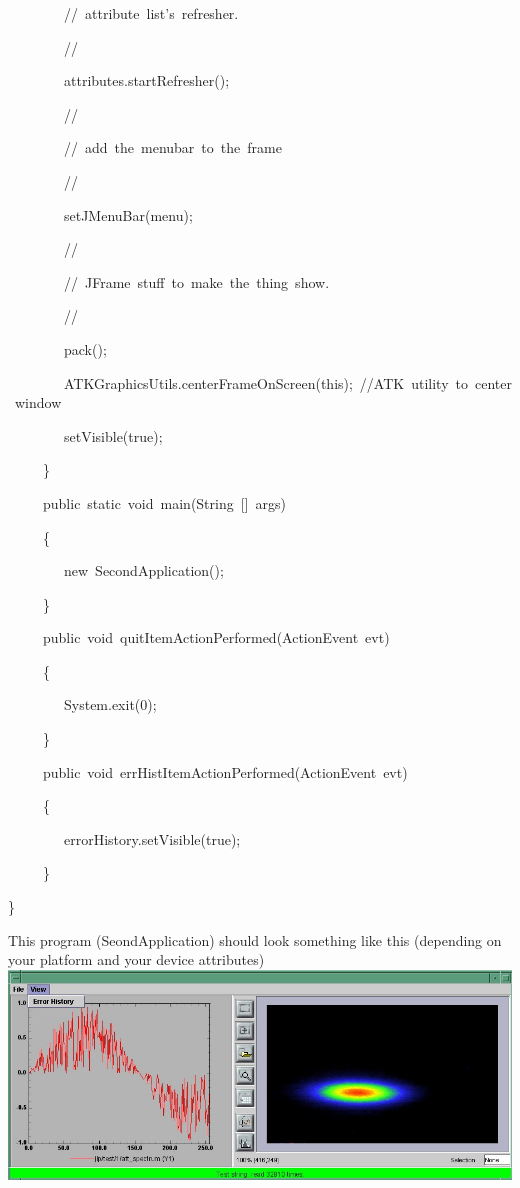 \begin{lyxcode}
~~~~~~~~//~attribute~list's~refresher.

~~~~~~~~//

~~~~~~~~attributes.startRefresher();

~~~~~~~~//

~~~~~~~~//~add~the~menubar~to~the~frame

~~~~~~~~//

~~~~~~~~setJMenuBar(menu);

~~~~~~~~//

~~~~~~~~//~JFrame~stuff~to~make~the~thing~show.

~~~~~~~~//

~~~~~~~~pack();

~~~~~~~~ATKGraphicsUtils.centerFrameOnScreen(this);~//ATK~utility~to~center~window

~~~~~~~~setVisible(true);

~~~~~\}

~~~~~public~static~void~main(String~{[}{]}~args)

~~~~~\{

~~~~~~~~new~SecondApplication();

~~~~~\}

~~~~~public~void~quitItemActionPerformed(ActionEvent~evt)

~~~~~\{

~~~~~~~~System.exit(0);

~~~~~\}

~~~~~public~void~errHistItemActionPerformed(ActionEvent~evt)

~~~~~\{

~~~~~~~~errorHistory.setVisible(true);

~~~~~\}

\}








\end{lyxcode}


This program (SeondApplication) should look something like this (depending
on your platform and your device attributes)\\


\includegraphics[scale=0.5]{atk/img/prog_guide_exple2}
\begin{lyxcode}

\end{lyxcode}

